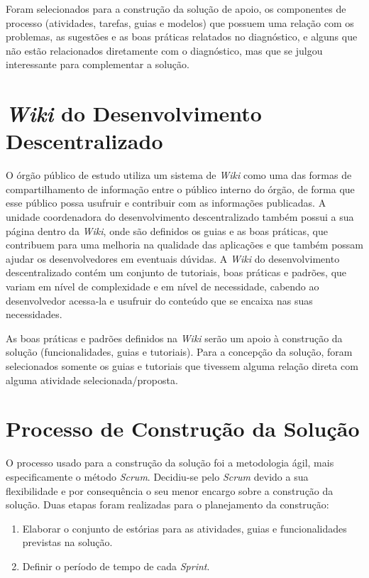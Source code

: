 Foram selecionados para a construção da solução de apoio, os componentes de processo (atividades, tarefas, guias e modelos) que possuem uma relação com os problemas, as sugestões e as boas práticas relatados no diagnóstico, e alguns que não estão relacionados diretamente com o diagnóstico, mas que se julgou interessante para complementar a solução.

\section{\textit{Wiki} do Desenvolvimento Descentralizado}

O órgão público de estudo utiliza um sistema de \textit{Wiki} como uma das formas de compartilhamento de informação entre o público interno do órgão, de forma que esse público possa usufruir e contribuir com as informações publicadas. A unidade coordenadora do desenvolvimento descentralizado também possui a sua página dentro da \textit{Wiki}, onde são definidos os guias e as boas práticas, que contribuem para uma melhoria na qualidade das aplicações e que também possam ajudar os desenvolvedores em eventuais dúvidas. A \textit{Wiki} do desenvolvimento descentralizado contém um conjunto de tutoriais, boas práticas e padrões, que variam em nível de complexidade e em nível de necessidade, cabendo ao desenvolvedor acessa-la e usufruir do conteúdo que se encaixa nas suas necessidades.

As boas práticas e padrões definidos na \textit{Wiki} serão um apoio à construção da solução (funcionalidades, guias e tutoriais). Para a concepção da solução, foram selecionados somente os guias e tutoriais que tivessem alguma relação direta com alguma atividade selecionada/proposta.

\section{Processo de Construção da Solução}

O processo usado para a construção da solução foi a metodologia ágil, mais especificamente o método \textit{Scrum}. Decidiu-se pelo \textit{Scrum} devido a sua flexibilidade e por consequência o seu menor encargo sobre a construção da solução. Duas etapas foram realizadas para o planejamento da construção:

\begin{enumerate}
\item Elaborar o conjunto de estórias para as atividades, guias e funcionalidades previstas na solução.
\item Definir o período de tempo de cada \textit{Sprint}.
\end{enumerate}

